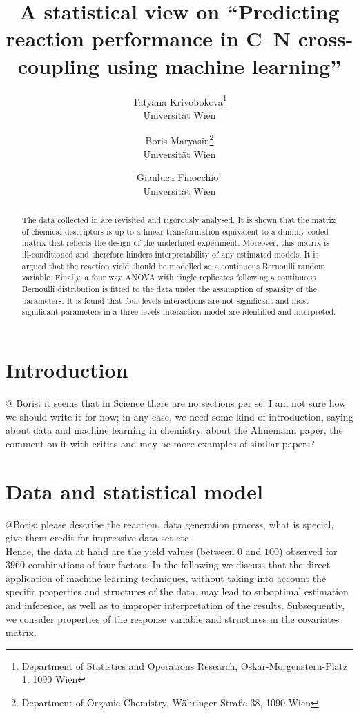 \documentclass[12pt]{article}
\title{A statistical view on ``Predicting reaction performance in C--N cross-coupling using machine learning''}
\author{Tatyana Krivobokova\footnote{Department of Statistics and Operations Research,
Oskar-Morgenstern-Platz 1, 1090 Wien}\\{Universit\"at Wien}
\and Boris Maryasin\footnote{Department of Organic Chemistry, W\"ahringer Stra{\ss}e 38, 1090 Wien}\\{Universit\"at Wien}
\and Gianluca Finocchio$^1$\\{Universit\"at Wien}
}
\begin{document}
\baselineskip=25pt

\maketitle

\begin{abstract}

\baselineskip=15pt \noindent The data collected in \citet{Ahneman2018} are revisited and rigorously analysed. It is shown that the matrix of chemical descriptors is up to a linear transformation equivalent to a dummy coded matrix that reflects the design of the underlined experiment. Moreover, this matrix is ill-conditioned and therefore hinders interpretability of any estimated models. It is argued that the reaction yield should be modelled as a continuous Bernoulli random variable. Finally, a four way ANOVA with single replicates following a continuous Bernoulli distribution is fitted to the data under the assumption of sparsity of the parameters. It is found that four levels interactions are not significant and most significant parameters in a three levels interaction model are identified and interpreted.  

\end{abstract}


\baselineskip=20pt
\section{Introduction}
{\color{red} @ Boris: it seems that in Science there are no sections per se; I am not sure how we should write it for now; in any case, we need some kind of introduction, saying about data and machine learning in chemistry, about the Ahnemann paper, the comment on it with critics and may be more examples of similar papers?} 
\label{sec:intro}
\doublespacing
\linespread{1.2}


\section{Data and statistical model}
\label{sec:model}
{\color{red} @Boris: please describe the reaction, data generation process, what is special, give them credit for impressive data set etc}\\
Hence, the data at hand are the yield values (between $0$ and $100$) observed for $3960$ combinations of four factors. In the following we discuss that the direct application of machine learning techniques, without taking into account the specific properties and structures of the data, may lead to suboptimal estimation and inference, as well as to improper interpretation of the results. Subsequently, we consider properties of the response variable and structures in the covariates matrix. 
\end{document}
